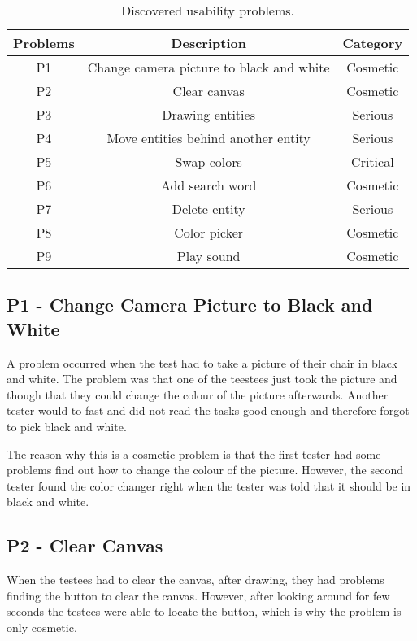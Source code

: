 \begin{table}[h]
	\centering 
	\begin{tabular}{|c|c|c|}
		\rowcolor{gray!50}
		\hline 
		Problems & Description & Category \\ 
		\hline
		P1 & Change camera picture to black and white & Cosmetic \\ 
 
		P2 & Clear canvas & Cosmetic \\ 
 
		P3 & Drawing entities & Serious \\ 

		P4 & Move entities behind another entity & Serious \\ 
 
		P5 & Swap colors & Critical \\ 
 
		P6 & Add search word & Cosmetic \\ 
 
		P7 & Delete entity & Serious \\ 
 
		P8 & Color picker & Cosmetic \\ 
 
		P9 & Play sound & Cosmetic \\ 
		\hline 
	\end{tabular} 
	\caption{Discovered usability problems.}
	\label{tab:usability-problems}
\end{table}

\subsection*{P1 - Change Camera Picture to Black and White}
A problem occurred when the test had to take a picture of their chair in black and white.
The problem was that one of the teestees just took the picture and though that they could change the colour of the picture afterwards.
Another tester would to fast and did not read the tasks good enough and therefore forgot to pick black and white.

The reason why this is a cosmetic problem is that the first tester had some problems find out how to change the colour of the picture.
However, the second tester found the color changer right when the tester was told that it should be in black and white.

\subsection*{P2 - Clear Canvas}
When the testees had to clear the canvas, after drawing, they had problems finding the button to clear the canvas.
However, after looking around for few seconds the testees were able to locate the button, which is why the problem is only cosmetic.

